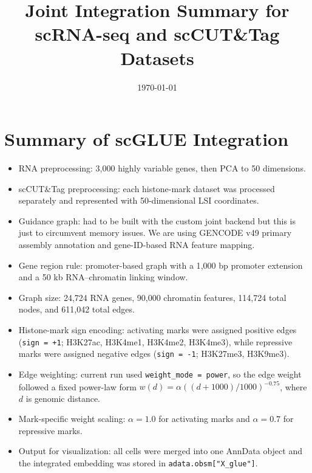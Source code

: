 \documentclass[11pt]{article}
\title{Joint Integration Summary for scRNA-seq and scCUT\&Tag Datasets}
\date{\today}
\begin{document}
\maketitle

\section*{Summary of scGLUE Integration}
\begin{itemize}
    \item RNA preprocessing: 3{,}000 highly variable genes, then PCA to 50 dimensions.
    \item scCUT\&Tag preprocessing: each histone-mark dataset was processed separately and represented with 50-dimensional LSI coordinates.
    \item Guidance graph: had to be built with the custom joint backend but this is just to circumvent memory issues. We are using GENCODE v49 primary assembly annotation and gene-ID-based RNA feature mapping.
    \item Gene region rule: promoter-based graph with a 1{,}000 bp promoter extension and a 50 kb RNA--chromatin linking window.
    \item Graph size: 24{,}724 RNA genes, 90{,}000 chromatin features, 114{,}724 total nodes, and 611{,}042 total edges.
    \item Histone-mark sign encoding: activating marks were assigned positive edges (\texttt{sign = +1}; H3K27ac, H3K4me1, H3K4me2, H3K4me3), while repressive marks were assigned negative edges (\texttt{sign = -1}; H3K27me3, H3K9me3).
    \item Edge weighting: current run used \texttt{weight\_mode = power}, so the edge weight followed a fixed power-law form \(w(d) = \alpha ((d + 1000)/1000)^{-0.75}\), where \(d\) is genomic distance.
    \item Mark-specific weight scaling: \(\alpha = 1.0\) for activating marks and \(\alpha = 0.7\) for repressive marks.     \item Output for visualization: all cells were merged into one AnnData object and the integrated embedding was stored in \texttt{adata.obsm["X\_glue"]}.
\end{itemize}

\newpage{}
\end{document}
